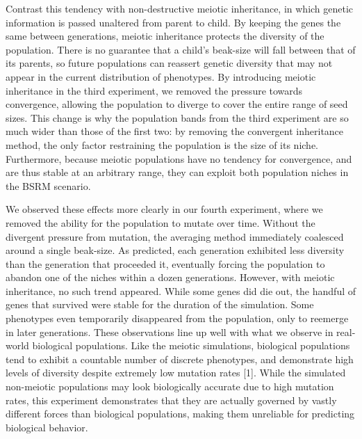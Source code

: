 \documentclass{article}
\begin{document}
Contrast this tendency with non-destructive meiotic inheritance, in which genetic information is passed unaltered from parent to child. By keeping the genes the same between generations, meiotic inheritance protects the diversity of the population. There is no guarantee that a child’s beak-size will fall between that of its parents, so future populations can reassert genetic diversity that may not appear in the current distribution of phenotypes. By introducing meiotic inheritance in the third experiment, we removed the pressure towards convergence, allowing the population to diverge to cover the entire range of seed sizes. This change is why the population bands from the third experiment are so much wider than those of the first two: by removing the convergent inheritance method, the only factor restraining the population is the size of its niche. Furthermore, because meiotic populations have no tendency for convergence, and are thus stable at an arbitrary range, they can exploit both population niches in the BSRM scenario.

We observed these effects more clearly in our fourth experiment, where we removed the ability for the population to mutate over time. Without the divergent pressure from mutation, the averaging method immediately coalesced around a single beak-size. As predicted, each generation exhibited less diversity than the generation that proceeded it, eventually forcing the population to abandon one of the niches within a dozen generations. However, with meiotic inheritance, no such trend appeared. While some genes did die out, the handful of genes that survived were stable for the duration of the simulation. Some phenotypes even temporarily disappeared from the population, only to reemerge in later generations. These observations line up well with what we observe in real-world biological populations. Like the meiotic simulations, biological populations tend to exhibit a countable number of discrete phenotypes, and demonstrate high levels of diversity despite extremely low mutation rates [1]. While the simulated non-meiotic populations may look biologically accurate due to high mutation rates, this experiment demonstrates that they are actually governed by vastly different forces than biological populations, making them unreliable for predicting biological behavior. 
\end{document}
